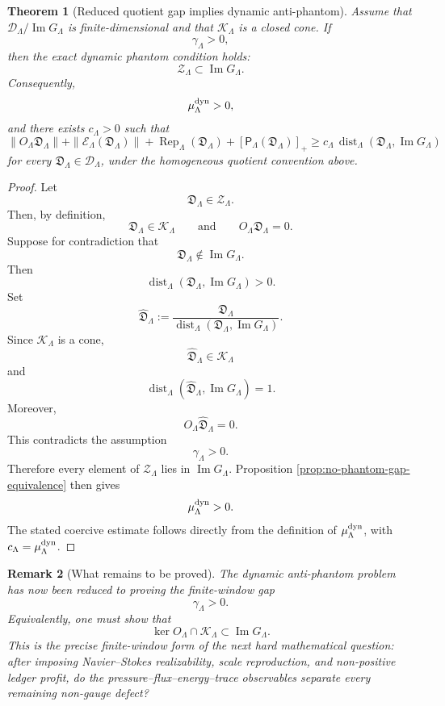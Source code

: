 \documentclass[11pt]{article}
\numberwithin{equation}{section}
\newtheorem{theorem}{Theorem}[section]
\newtheorem{remark}[theorem]{Remark}
\begin{document}
\begin{theorem}[Reduced quotient gap implies dynamic anti-phantom]
\label{thm:reduced-gap-implies-dynamic}
Assume that \(\mathcal D_\Lambda/\operatorname{Im}G_\Lambda\) is
finite-dimensional and that \(\mathcal K_\Lambda\) is a closed cone.  If
\[
        \gamma_\Lambda>0,
\]
then the exact dynamic phantom condition holds:
\[
        \mathcal Z_\Lambda\subset\operatorname{Im}G_\Lambda.
\]
Consequently,
\[
        \mu_\Lambda^{\rm dyn}>0,
\]
and there exists \(c_\Lambda>0\) such that
\[
\boxed{
        \|O_\Lambda\mathfrak D_\Lambda\|
        +
        \|\mathcal E_\Lambda(\mathfrak D_\Lambda)\|
        +
        \operatorname{Rep}_\Lambda(\mathfrak D_\Lambda)
        +
        [\mathsf P_\Lambda(\mathfrak D_\Lambda)]_+
        \ge
        c_\Lambda\,
        \operatorname{dist}_\Lambda
        (\mathfrak D_\Lambda,\operatorname{Im}G_\Lambda)
}
\]
for every \(\mathfrak D_\Lambda\in\mathcal D_\Lambda\), under the
homogeneous quotient convention above.
\end{theorem}

\begin{proof}
Let
\[
        \mathfrak D_\Lambda\in\mathcal Z_\Lambda.
\]
Then, by definition,
\[
        \mathfrak D_\Lambda\in\mathcal K_\Lambda
        \qquad\text{and}\qquad
        O_\Lambda\mathfrak D_\Lambda=0.
\]
Suppose for contradiction that
\[
        \mathfrak D_\Lambda\notin\operatorname{Im}G_\Lambda.
\]
Then
\[
        \operatorname{dist}_\Lambda
        (\mathfrak D_\Lambda,\operatorname{Im}G_\Lambda)>0.
\]
Set
\[
        \widehat{\mathfrak D}_\Lambda
        :=
        \frac{\mathfrak D_\Lambda}
        {\operatorname{dist}_\Lambda
        (\mathfrak D_\Lambda,\operatorname{Im}G_\Lambda)}.
\]
Since \(\mathcal K_\Lambda\) is a cone,
\[
        \widehat{\mathfrak D}_\Lambda\in\mathcal K_\Lambda
\]
and
\[
        \operatorname{dist}_\Lambda
        (\widehat{\mathfrak D}_\Lambda,\operatorname{Im}G_\Lambda)=1.
\]
Moreover,
\[
        O_\Lambda\widehat{\mathfrak D}_\Lambda=0.
\]
This contradicts the assumption
\[
        \gamma_\Lambda>0.
\]
Therefore every element of \(\mathcal Z_\Lambda\) lies in
\(\operatorname{Im}G_\Lambda\).  Proposition
\ref{prop:no-phantom-gap-equivalence} then gives
\[
        \mu_\Lambda^{\rm dyn}>0.
\]
The stated coercive estimate follows directly from the definition of
\(\mu_\Lambda^{\rm dyn}\), with \(c_\Lambda=\mu_\Lambda^{\rm dyn}\).
\end{proof}

\begin{remark}[What remains to be proved]
The dynamic anti-phantom problem has now been reduced to proving the
finite-window gap
\[
        \gamma_\Lambda>0.
\]
Equivalently, one must show that
\[
        \ker O_\Lambda
        \cap
        \mathcal K_\Lambda
        \subset
        \operatorname{Im}G_\Lambda.
\]
This is the precise finite-window form of the next hard mathematical
question: after imposing Navier--Stokes realizability, scale reproduction,
and non-positive ledger profit, do the pressure--flux--energy--trace
observables separate every remaining non-gauge defect?
\end{remark}
\end{document}
